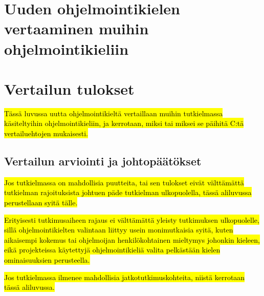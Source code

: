\section{Uuden ohjelmointikielen vertaaminen muihin ohjelmointikieliin}

\section{Vertailun tulokset}

\hl{Tässä luvussa uutta ohjelmointikieltä vertaillaan muihin tutkielmassa
käsiteltyihin ohjelmointikieliin, ja kerrotaan, miksi tai miksei se päihitä
C:tä vertailuehtojen mukaisesti.}

\subsection{Vertailun arviointi ja johtopäätökset}

\hl{Jos tutkielmassa on mahdollisia puutteita, tai sen tulokset eivät
välttämättä tutkielman rajoituksista johtuen päde tutkielman ulkopuolella,
tässä aliluvussa perustellaan syitä tälle.}

\hl{Erityisesti tutkimusaiheen rajaus ei välttämättä yleisty tutkimuksen
ulkopuolelle, sillä ohjelmointikielten valintaan liittyy usein monimutkaisia
syitä, kuten aikaisempi kokemus tai ohjelmoijan henkilökohtainen mieltymys
johonkin kieleen, eikä projekteissa käytettyjä ohjelmointikieliä valita
pelkästään kielen ominaisuuksien perusteella.}

\hl{Jos tutkielmassa ilmenee mahdollisia jatkotutkimuskohteita, niistä
kerrotaan tässä aliluvussa.}
